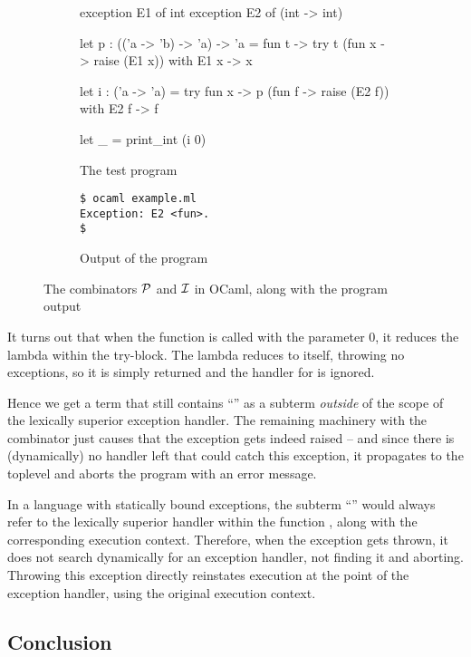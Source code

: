 \begin{figure}
\centering
\begin{subfigure}[b]{0.55\textwidth}
\begin{codeml}
exception E1 of int
exception E2 of (int -> int)

let p : (('a -> 'b) -> 'a) -> 'a =
  fun t ->
    try t (fun x -> raise (E1 x))
    with E1 x -> x

let i : ('a -> 'a) =
  try fun x -> p (fun f -> raise (E2 f))
  with E2 f -> f

let _ =
  print_int (i 0)
\end{codeml}
\caption{The test program}
\end{subfigure}
%
\begin{subfigure}[b]{0.35\textwidth}
\begin{verbatim}
$ ocaml example.ml
Exception: E2 <fun>.
$
\end{verbatim}
\caption{Output of the program}
\end{subfigure}
\caption{The combinators $\mathcal{P}$ and $\mathcal{I}$ in OCaml, along with the program output}
\label{fig:ip-ocaml}
\end{figure}

It turns out that when the function  is called with the parameter $0$, it reduces
the lambda within the try-block. The lambda reduces to itself, throwing no exceptions,
so it is simply returned and the handler for  is ignored.

Hence we get a term that still contains ``'' as a subterm \emph{outside}
of the scope of the lexically superior exception handler. The remaining machinery
with the combinator  just causes that the exception gets indeed raised -- and since
there is (dynamically) no handler left that could catch this exception, it propagates to the
toplevel and aborts the program with an error message.

In a language with statically bound exceptions, the subterm ``'' would
always refer to the lexically superior handler within the function , along
with the corresponding execution context. Therefore, when the exception  gets thrown,
it does not search dynamically for an exception handler, not finding it and aborting.
Throwing this exception directly reinstates execution at the point of the exception handler,
using the original execution context.


\subsection{Conclusion}

